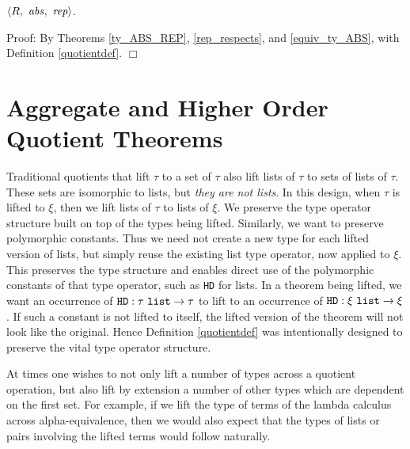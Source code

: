 \documentclass[envcountsame,runningheads]{llncs}
\begin{document}

\begin{theorem}
\label{quotientthm}
$\langle R,\ {\it abs},\ {\it rep} \rangle$.
\end{theorem}
Proof:
By Theorems \ref{ty_ABS_REP},
\ref{rep_respects},
and
\ref{equiv_ty_ABS}, with Definition
\ref{quotientdef}.
$\Box$


%
\section{Aggregate and Higher Order Quotient Theorems}
%
\label{extensions}

Traditional quotients that lift $\tau$ to a set of $\tau$ also
lift lists of $\tau$ to sets of lists of $\tau$. 
These sets are isomorphic to lists, but {\it they are not lists}.
In this design, when $\tau$ is lifted to $\xi$, then 
we lift lists of $\tau$ to lists of $\xi$.
We preserve the type operator structure built on top of the
types being lifted.  Similarly, we want to preserve polymorphic constants.
Thus we need not create a new type for each lifted version of lists,
but simply reuse the existing list type operator, now applied to $\xi$. 
This preserves the type structure and enables direct use
of the polymorphic constants of that type operator, such as 
{\tt HD} for lists.
In a theorem being lifted, we want an occurrence of
$\mbox{\tt HD} : \tau\ \mbox{\tt list} \rightarrow \tau$
to lift to an occurrence of
$\mbox{\tt HD} : \xi\ \mbox{\tt list} \rightarrow \xi$.
If such a constant is not lifted to itself, the lifted version
of the theorem will not look like the original.
Hence Definition \ref{quotientdef} was
intentionally
designed
to preserve the vital type operator structure.

\begin{comment}
\end{comment}
At times one wishes to not only lift a number of types across a
quotient operation, but also lift by extension a number of other
types which are dependent on the first set.  For example, if we
lift the type of terms of the lambda calculus across alpha-equivalence,
then we would also expect that the types of lists or pairs involving
the lifted terms would follow naturally.
\end{document}
